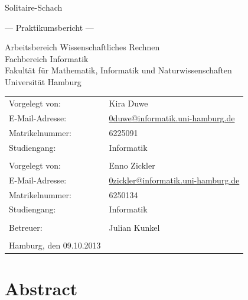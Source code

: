 \documentclass[
	12pt,
	a4paper,
	BCOR10mm,
	DIV14,
	listof=totoc,
	bibliography=totoc,
	headsepline
]{scrreprt}
\begin{document}
\begin{titlepage}
	\begin{center}
		{\titlefont\huge Solitaire-Schach\par}

		\bigskip
		\bigskip

		{\titlefont\Large --- Praktikumsbericht ---\par}

		\bigskip
		\bigskip

		{\large Arbeitsbereich Wissenschaftliches Rechnen\\
		Fachbereich Informatik\\
		Fakultät für Mathematik, Informatik und Naturwissenschaften\\
		Universität Hamburg\par}
	\end{center}

	\vfill

	{\large \begin{tabular}{ll}
		Vorgelegt von: & Kira Duwe\\
		E-Mail-Adresse: & \href{mailto:adresse@email.de}{0duwe@informatik.uni-hamburg.de} \\
		Matrikelnummer: & 6225091 \\
		Studiengang: & Informatik \\
		\\
			Vorgelegt von: & Enno Zickler\\
		E-Mail-Adresse: & \href{mailto:adresse@email.de}{0zickler@informatik.uni-hamburg.de} \\
		Matrikelnummer: & 6250134 \\
		Studiengang: & Informatik \\
		\\
		Betreuer: & Julian Kunkel \\
		\\
		Hamburg, den 09.10.2013
	\end{tabular}\par}
\end{titlepage}

\chapter*{Abstract}

\thispagestyle{empty}
\end{document}
